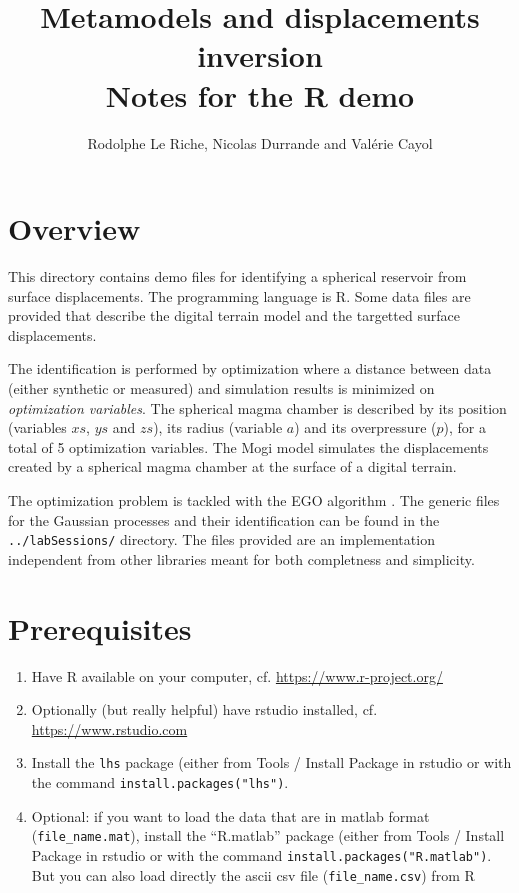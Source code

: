 \documentclass[12pt]{article}
\begin{document}
\title{Metamodels and displacements  inversion \\ Notes for the R demo}
\author{Rodolphe Le Riche, Nicolas Durrande and Valérie Cayol}
\maketitle

\section{Overview}
This directory contains demo files for identifying a spherical reservoir from surface displacements. The programming language is R. 
Some data files are provided that describe the digital terrain model and the targetted surface displacements.

The identification is performed by optimization where a distance between data (either synthetic or measured) 
and simulation results is minimized on \emph{optimization variables}. 
The spherical magma chamber is described by its position (variables $xs$, $ys$ and $zs$), its radius (variable $a$) and 
its overpressure ($p$), for a total of 5 optimization variables. The Mogi model \cite{} simulates the displacements created 
by a spherical magma chamber at the surface of a digital terrain.

The optimization problem is tackled with the EGO algorithm \cite{Jones1998}. 
The generic files for the Gaussian processes and their identification can be found in the \texttt{../labSessions/} directory.
The files provided are an implementation independent from other libraries meant for both completness and simplicity.

\section{Prerequisites}
\begin{enumerate}
\item Have R available on your computer, cf. \url{https://www.r-project.org/}
\item Optionally (but really helpful) have rstudio installed, cf. \url{https://www.rstudio.com}
\item Install the \texttt{lhs} package (either from Tools / Install Package in rstudio or with the command \texttt{install.packages("lhs")}.
\item Optional: if you want to load the data that are in matlab format (\texttt{file\_name.mat}), 
install the ``R.matlab'' package (either from Tools / Install Package in rstudio or with the command \texttt{install.packages("R.matlab")}. But you can also load directly the ascii csv file (\texttt{file\_name.csv}) from R
\end{enumerate}
\end{document}
